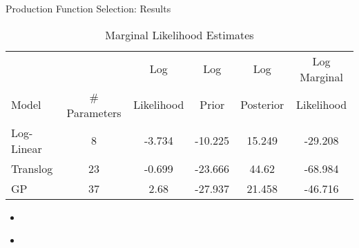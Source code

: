 \documentclass{beamer}
\begin{document}
\begin{frame}{Production Function Selection: Results}
\begin{table}[!h]
	\centering
	\begin{tabular}{l|c|c|c|c|c}
		&  & Log & Log & Log & Log Marginal \\ 
		Model & \# Parameters & Likelihood & Prior & Posterior & Likelihood \\ 
		\hline
		\hline
		Log-Linear & 8 & -3.734 & -10.225 & 15.249 & -29.208 \\ 
		Translog & 23 & -0.699 & -23.666 & 44.62 & -68.984 \\ 
		GP & 37 & 2.68 & -27.937 & 21.458 & -46.716 \\ 
		\hline
	\end{tabular}
	\caption{Marginal Likelihood Estimates} 
	\label{tab:GPSF-ML}
\end{table}
\begin{itemize}
	\item 
\end{itemize}
\end{frame}

\begin{frame}{}
\begin{itemize}
	\item 
\end{itemize}
\end{frame}
\end{document}
